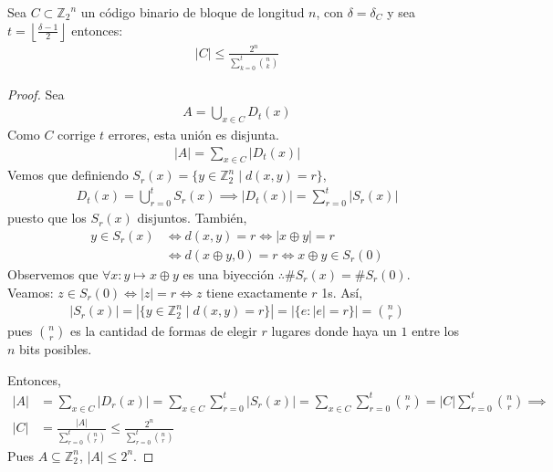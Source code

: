 \begin{theorem}
Sea $C \subset {\mathbb{Z}_2}^n$ un código binario de bloque de longitud $n$, con $\delta = \delta_C$ y sea $t = \left\lfloor{\frac{\delta - 1}{2}} \right\rfloor$ entonces:
\begin{align}
\left| C \right| \le \frac{2^n}{\displaystyle \sum\limits_{k=0}^{t} \displaystyle\binom{n}{k}}
\end{align}
\end{theorem}

\begin{proof}
Sea \begin{align}
A = \bigcup_{x\in C} D_t(x)
\end{align}
Como $C$ corrige $t$ errores, esta unión es disjunta.
\begin{align}
\left|A\right| = \sum_{x\in C} \left|D_t(x)\right|
\end{align}
Vemos que definiendo $S_r(x) = \{y \in \mathbb{Z}_2^n \mid d(x,y) = r\}$,
\begin{align}
D_t(x) = \bigcup_{r=0}^t S_r(x) \implies \left|D_t(x)\right| = \sum_{r=0}^t \left|S_r(x)\right|
\end{align}
puesto que los $S_r(x)$ disjuntos. También,
\begin{align}
y \in S_r(x) &\iff d(x,y) = r \iff \left|x\oplus y\right| = r\\
    &\iff d(x\oplus y, 0) = r \iff x\oplus y \in S_r(0)
\end{align}
Observemos que $\forall x: y \mapsto x \oplus y $ es una biyección $\therefore\# S_r(x) = \# S_r(0)$.\\
Veamos: $z \in S_r(0) \iff |z| = r \iff z$ tiene exactamente $r$ 1s.
Así, 
\begin{align}
|S_r(x)| = \left| \{y \in \mathbb{Z}_2^n \mid d(x,y) = r\} \right| = \left|\{e : |e| = r\}\right| = {\binom{n}{r}}
\end{align}
pues $\binom{n}{r}$ es la cantidad de formas de elegir $r$ lugares donde haya un $1$ entre los $n$ bits posibles.

Entonces,
\begin{align}
\left|A\right| &= \sum_{x\in C} \left|D_r(x)\right| = \sum_{x\in C} \sum_{r=0}^t \left|S_r(x)\right|
= \sum_{x\in C}\sum_{r=0}^t {\binom{n}{r}}
= \left|C\right| \sum_{r=0}^t {\binom{n}{r}} 
\implies\\
\left|C\right| &= \frac{\left|A\right|}
{\sum\limits_{r=0}^t {\binom{n}{r}}} \le \frac{2^n}{\sum\limits_{r=0}^t {\binom{n}{r}}}
\end{align}
Pues $A\subseteq \mathbb{Z}_2^n$, $\left|A\right| \le 2^n$.
\end{proof}

